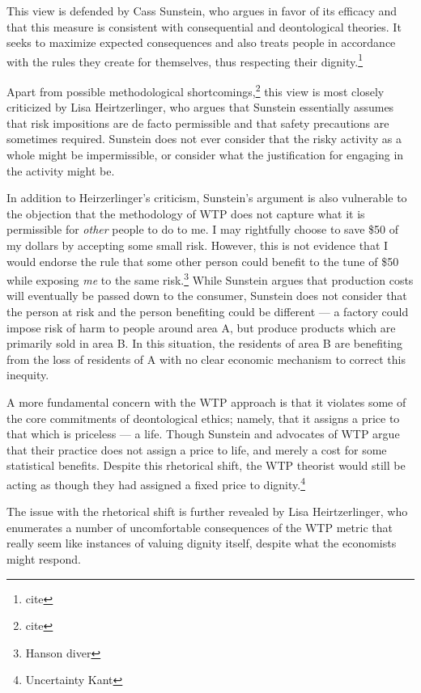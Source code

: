 \documentclass[12pt]{article}
\begin{document}
This view is defended by Cass Sunstein, who argues in favor of its efficacy and
that this measure is consistent with consequential and deontological theories.
It seeks to maximize expected consequences and also treats people in accordance
with the rules they create for themselves, thus respecting their
dignity.\footnote{cite}

Apart from possible methodological shortcomings,\footnote{cite} this view is
most closely criticized by Lisa Heirtzerlinger, who argues that Sunstein
essentially assumes that risk impositions are de facto permissible and that
safety precautions are sometimes required. Sunstein does not ever consider that
the risky activity as a whole might be impermissible, or consider what the
justification for engaging in the activity might be.

In addition to Heirzerlinger’s criticism, Sunstein’s argument is also
vulnerable to the objection that the methodology of WTP does not capture what
it is permissible for \emph{other} people to do to me. I may rightfully choose
to save \$50 of my dollars by accepting some small risk. However, this is not
evidence that I would endorse the rule that some other person could benefit to
the tune of \$50 while exposing \emph{me} to the same risk.\footnote{Hanson
diver} While Sunstein argues that production costs will eventually be passed
down to the consumer, Sunstein does not consider that the person at risk and
the person benefiting could be different --- a factory could impose risk of
harm to people around area A, but produce products which are primarily sold in
area B. In this situation, the residents of area B are benefiting from the loss
of residents of A with no clear economic mechanism to correct this inequity.

A more fundamental concern with the WTP approach is that it violates some of
the core commitments of deontological ethics; namely, that it assigns a price
to that which is priceless --- a life. Though Sunstein and advocates of WTP
argue that their practice does not assign a price to life, and merely a cost
for some statistical benefits. Despite this rhetorical shift, the WTP theorist
would still be acting as though they had assigned a fixed price to
dignity.\footnote{Uncertainty Kant}

The issue with the rhetorical shift is further revealed by Lisa Heirtzerlinger,
who enumerates a number of uncomfortable consequences of the WTP metric that
really seem like instances of valuing dignity itself, despite what the
economists might respond.
\end{document}
